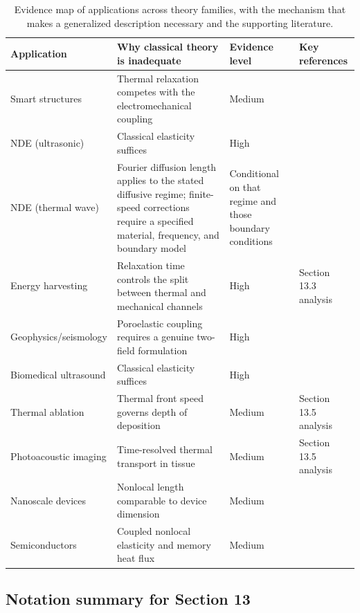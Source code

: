 \begin{table}[htbp]
\centering
\small
\caption{Evidence map of applications across theory families, with the mechanism that makes a generalized description necessary and the supporting literature.}
\label{tab:evidence_map}
\begin{tabularx}{\textwidth}{@{}p{2.2cm}X p{2.2cm}X@{}}
\toprule
\textbf{Application} & \textbf{Why classical theory is inadequate} & \textbf{Evidence level} & \textbf{Key references} \\
\midrule
Smart structures & Thermal relaxation competes with the electromechanical coupling & Medium & \cite{Abouelregal2023} \\
NDE (ultrasonic) & Classical elasticity suffices & High & \cite{Achenbach1973} \\
NDE (thermal wave) & Fourier diffusion length applies to the stated diffusive regime; finite-speed corrections require a specified material, frequency, and boundary model & Conditional on that regime and those boundary conditions & \cite{Joseph1989,Joseph1990} \\
Energy harvesting & Relaxation time controls the split between thermal and mechanical channels & High & Section 13.3 analysis \\
Geophysics/\allowbreak seismology & Poroelastic coupling requires a genuine two-field formulation & High & \cite{Cowin1983,Iesan1986} \\
Biomedical ultrasound & Classical elasticity suffices & High & \cite{Achenbach1973} \\
Thermal ablation & Thermal front speed governs depth of deposition & Medium & Section 13.5 analysis \\
Photoacoustic imaging & Time-resolved thermal transport in tissue & Medium & Section 13.5 analysis \\
Nanoscale devices & Nonlocal length comparable to device dimension & Medium & \cite{Maranganti2007,Maranganti2006} \\
Semi\-conductors & Coupled nonlocal elasticity and memory heat flux & Medium & \cite{Gupta2026HeatMap} \\
\bottomrule
\end{tabularx}
\end{table}

\subsection{Notation summary for Section 13}

